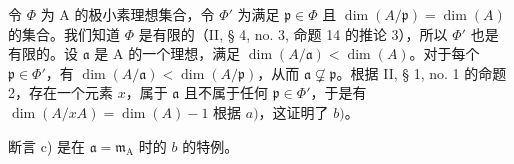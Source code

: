 令 \(\Phi\) 为 A 的极小素理想集合，令 \(\Phi'\) 为满足 \(\mathfrak{p} \in \Phi\) 且 \(\dim(A/\mathfrak{p}) = \dim(A)\) 的集合。我们知道 \(\Phi\) 是有限的（II, § 4, no. 3, 命题 14 的推论 3），所以 \(\Phi'\) 也是有限的。设 \(\mathfrak{a}\) 是 A 的一个理想，满足 \(\dim(A/\mathfrak{a}) < \dim(A)\)。对于每个 \(\mathfrak{p} \in \Phi'\)，有 \(\dim(A/\mathfrak{a}) < \dim(A/\mathfrak{p})\)，从而 \(\mathfrak{a} \not\subsetneq \mathfrak{p}\)。根据 II, § 1, no. 1 的命题 2，存在一个元素 \(x\)，属于 \(\mathfrak{a}\) 且不属于任何 \(\mathfrak{p} \in \Phi'\)，于是有 \(\dim(A/xA) = \dim(A) - 1\) 根据 \(a)\)，这证明了 \(b)\)。

断言 c) 是在 \(\mathfrak{a} = \mathfrak{m}_{\mathrm{A}}\) 时的 \(b\) 的特例。
\relax{}
